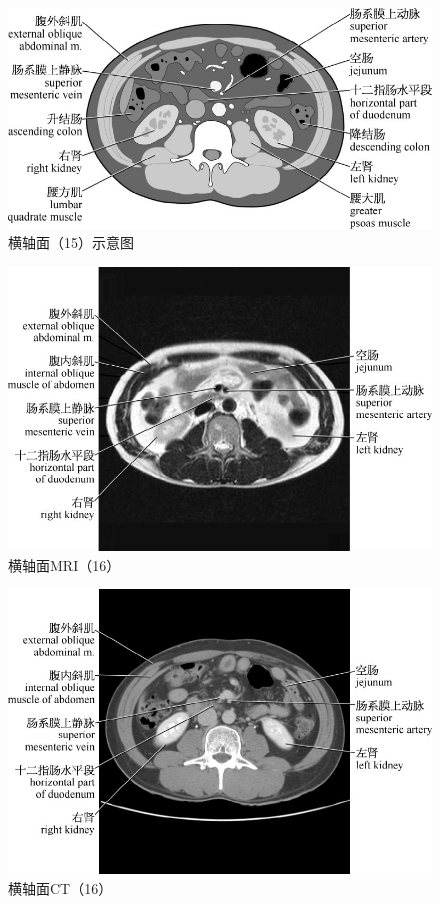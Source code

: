 \begin{figure}[!htbp]
 \centering
 \includegraphics{./images/Image00046.jpg}
 \captionsetup{justification=centering}
 \caption{横轴面（15）示意图}
  \end{figure} 
 \FloatBarrier

\begin{figure}[!htbp]
 \centering
 \includegraphics{./images/Image00047.jpg}
 \captionsetup{justification=centering}
 \caption{横轴面MRI（16）}
  \end{figure} 
 \FloatBarrier

\begin{figure}[!htbp]
 \centering
 \includegraphics{./images/Image00048.jpg}
 \captionsetup{justification=centering}
 \caption{横轴面CT（16）}
  \end{figure} 
 \FloatBarrier

